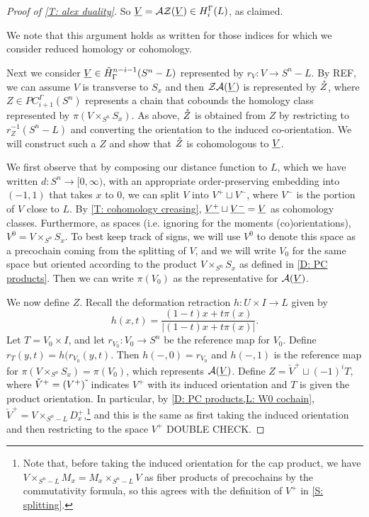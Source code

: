 \begin{example}
\begin{proof}[Proof of \cref{T: alex duality}]
So $\underline{V} = \mathcal{A} \mathcal{Z}(\underline{V}) \in H_i^\Gamma(L)$, as claimed.

We note that this argument holds as written for those indices for which we consider reduced homology or cohomology.

Next we consider $\underline{V} \in \tilde H^{n-i-1}_\Gamma(S^n-L)$ represented by $r_V \colon V \to S^n-L$.
By REF, we can assume $V$ is transverse to $S_x$ and then $\mathcal{Z} \mathcal{A}(\underline{V})$ is represented by $\mathring{Z}$, where $Z \in PC_{i+1}^\Gamma(S^n)$ represents a chain that cobounds the homology class represented by $\pi(V \times_{S^n} S_x)$.
As above, $\mathring{Z}$ is obtained from $Z$ by restricting to $r_Z^{-1}(S^n-L)$ and converting the orientation to the induced co-orientation.
We will construct such a $Z$ and show that $\mathring{Z}$ is cohomologous to $\underline{V}$.

We first observe that by composing our distance function to $L$, which we have written $d \colon S^n \to [0,\infty)$, with an appropriate order-preserving embedding into $(-1,1)$ that takes $x$ to $0$, we can split $V$ into $V^+ \sqcup V^-$, where $V^-$ is the portion of $V$ close to $L$.
By \cref{T: cohomology creasing}, $\underline{V^+} \sqcup \underline{V^-} = \underline{V}$ as cohomology classes.
Furthermore, as spaces (i.e. ignoring for the moments (co)orientations), $V^0 = V \times_{S^n} S_x$.
To best keep track of signs, we will use $V^0$ to denote this space as a precochain coming from the splitting of $V$, and we will write $V_0$ for the same space but oriented according to the product $V \times_{S^n} S_x$ as defined in \cref{D: PC products}.
Then we can write $\pi(V_0)$ as the representative for $\mathcal{A}(\underline{V})$.

\begin{comment}
Let us determine the relationship between $V_0$ and $(V^0)\,\check{\vrule height1.3ex width0pt}$ COME BACK IF WE NEED THIS
\end{comment}

We now define $Z$.
Recall the deformation retraction $h \colon U \times I \to L$ given by $$h(x,t) = \frac{(1-t)x + t\pi(x)}{|(1-t)x + t\pi(x) |}.$$
Let $T = V_0 \times I$, and let $r_{V_0} \colon V_0 \to S^n$ be the reference map for $V_0$.
Define $r_T(y,t) = h(r_{V_0}(y,t)$.
Then $h(-,0) = r_{V_0}$ and $h(-,1)$ is the reference map for $\pi(V \times_{S^n} S_x) = \pi(V_0)$, which represents $\mathcal{A}(\underline{V})$.
Define $Z = \check V^+ \sqcup (-1)^i T$, where $\check V^+ = (V^+)\,\check{\vrule height1.3ex width0pt}$ indicates $V^+$ with its induced orientation and $T$ is given the product orientation.
In particular, by \cref{D: PC products,L: W0 cochain},  $\check V^+ = V \times_{S^n-L} D_x^+$,\footnote{Note that, before taking the induced orientation for the cap product, we have $V \times_{S^n-L} M_x = M_x \times_{S^n-L} V$ as fiber products of precochains by the commutativity formula, so this agrees with the definition of $V^+$ in \cref{S: splitting}.} and this is the same as first taking the induced orientation and then restricting to the space $V^+$ DOUBLE CHECK.


\end{proof}
\end{example}
